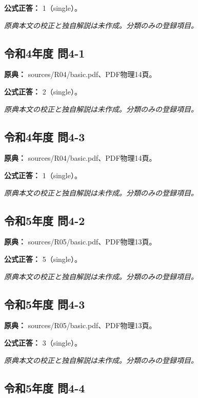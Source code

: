 \textbf{公式正答：} 1（single）。

\par\textit{原典本文の校正と独自解説は未作成。分類のみの登録項目。}

\subsection{令和4年度 問4-1}
\label{q:r04-reg-basic-4-1}

\noindent\textbf{原典：} sources/R04/basic.pdf、PDF物理14頁。

\textbf{公式正答：} 2（single）。

\par\textit{原典本文の校正と独自解説は未作成。分類のみの登録項目。}

\subsection{令和4年度 問4-3}
\label{q:r04-reg-basic-4-3}

\noindent\textbf{原典：} sources/R04/basic.pdf、PDF物理14頁。

\textbf{公式正答：} 1（single）。

\par\textit{原典本文の校正と独自解説は未作成。分類のみの登録項目。}

\subsection{令和5年度 問4-2}
\label{q:r05-reg-basic-4-2}

\noindent\textbf{原典：} sources/R05/basic.pdf、PDF物理13頁。

\textbf{公式正答：} 5（single）。

\par\textit{原典本文の校正と独自解説は未作成。分類のみの登録項目。}

\subsection{令和5年度 問4-3}
\label{q:r05-reg-basic-4-3}

\noindent\textbf{原典：} sources/R05/basic.pdf、PDF物理13頁。

\textbf{公式正答：} 3（single）。

\par\textit{原典本文の校正と独自解説は未作成。分類のみの登録項目。}

\subsection{令和5年度 問4-4}
\label{q:r05-reg-basic-4-4}

